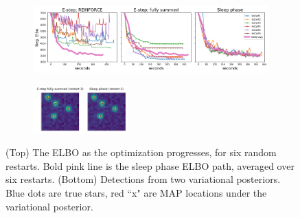 \begin{figure}[!ht]
    \centering
    \begin{subfigure}[t]{0.9\textwidth}
    \centering
    \includegraphics[width=\textwidth]{figures/optim_path_compare.png}
    \end{subfigure}
    
    \begin{subfigure}[t]{\textwidth}
    \centering
    \includegraphics[width=0.4\textwidth]{figures/optim_path_detect_compare.png}
    \end{subfigure}
    \vspace{-3em}
    \caption{(Top) The ELBO as the optimization progresses, for six random restarts. Bold pink line is the sleep phase ELBO path, averaged over six restarts. (Bottom) Detections from two variational posteriors. Blue dots are true stars, red ``x" are MAP locations under the variational posterior. }
    \label{fig:optim_path}
\end{figure}

